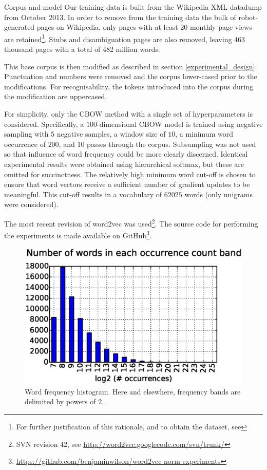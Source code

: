 \documentclass{article} %
\begin{document}
\begin{section}{Corpus and model}
Our training data is built from the Wikipedia XML datadump from October 2013.
In order to remove from the training data the bulk of robot-generated pages on Wikipedia, only pages with at least 20 monthly page views are retained\footnote{For further justification of this rationale, and to obtain the dataset, see \blogpost}.
Stubs and disambiguation pages are also removed, leaving 463 thousand pages with a total of 482 million words.

This base corpus is then modified as described in section \ref{experimental_design}.
Punctuation and numbers were removed and the corpus lower-cased prior to the modifications.
For recognisability, the tokens introduced into the corpus during the modification are uppercased.

For simplicity, only the CBOW method with a single set of hyperparameters is considered.
Specifically, a $100$-dimensional CBOW model is trained using negative sampling with 5 negative samples, a window size of $10$, a minimum word occurrence of $200$, and $10$ passes through the corpus.
Subsampling was not used so that influence of word frequency could be more clearly discerned.
Identical experimental results were obtained using hierarchical softmax, but these are omitted for succinctness.
The relatively high minimum word cut-off is chosen to ensure that word vectors receive a sufficient number of gradient updates to be meaningful.
This cut-off results in a vocabulary of $62025$ words (only unigrams were considered).

The most recent revision of word2vec was used\footnote{SVN revision 42, see \url{http://word2vec.googlecode.com/svn/trunk/}}.
The source code for performing the experiments is made available on GitHub\footnote{\url{https://github.com/benjaminwilson/word2vec-norm-experiments}}.

\begin{figure}\label{fig:frequency-histogram}
	\includegraphics[scale=0.5]{occurrence-histogram}
	\caption{
	Word frequency histogram.
	Here and elsewhere, frequency bands are delimited by powers of $2$.
	}
\end{figure}


\end{section}
\end{document}
